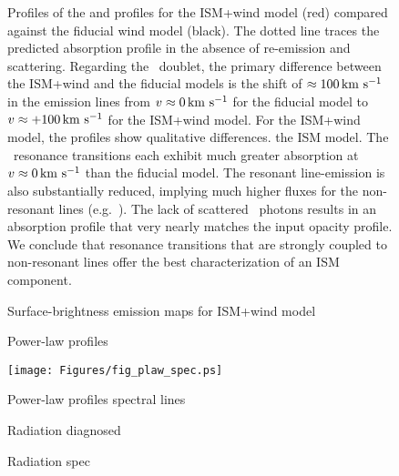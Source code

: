 \documentclass[12pt,preprint]{aastex}
\begin{document}
\begin{figure}
\caption{
Profiles of the  and  profiles for the ISM+wind
model (red) compared against the fiducial wind model (black). 
The dotted line traces the predicted absorption profile in the absence
of re-emission and scattering.
Regarding the ~doublet, the primary difference between the
ISM+wind and the fiducial models is the shift of $\approx 100 \, {\rm km~s^{-1}}$
in the emission lines from $v \approx 0 \, {\rm km~s^{-1}}$ for the fiducial
model to $v \approx +100\, {\rm km~s^{-1}}$ for the ISM+wind model. 
For the ISM+wind model, 
the  profiles show qualitative differences. 
the ISM model.  The \feiid\ resonance transitions each exhibit much
greater absorption at $v \approx 0 \, {\rm km~s^{-1}}$ than the fiducial model.
The resonant line-emission is also substantially
reduced, implying much higher fluxes for the non-resonant lines (e.g.\
\feiic).  The lack of scattered \feiia\ photons results in an
absorption profile that very nearly matches the input opacity profile.
We conclude that resonance transitions that are strongly coupled to
non-resonant lines offer the best
characterization of an ISM component.
}
\label{fig:ISM_spec}
\end{figure}

\begin{figure}
\caption{
Surface-brightness emission maps for ISM+wind model
}
\label{fig:ISM_ifu}
\end{figure}

\begin{figure}
\caption{
Power-law profiles
}
\label{fig:plaws}
\end{figure}

\begin{figure}
\texttt{[image: Figures/fig\_plaw\_spec.ps]}
\caption{
Power-law profiles spectral lines
}
\label{fig:plaws_spec}
\end{figure}

\begin{figure}
\caption{
Radiation diagnosed
}
\label{fig:rad_nvt}
\end{figure}

\begin{figure}
\caption{
Radiation spec
}
\label{fig:rad_spec}
\end{figure}
\end{document}
